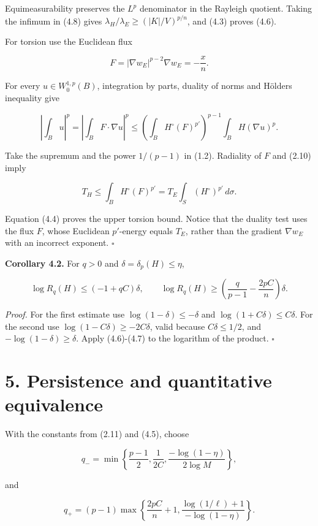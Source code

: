 \documentclass[11pt]{article}
\begin{document}
Equimeasurability preserves the \(L^p\) denominator in the Rayleigh
quotient. Taking the infimum in (4.8) gives
\(\lambda_H/\lambda_E\geq(|K|/V)^{p/n}\), and (4.3) proves (4.6).

For torsion use the Euclidean flux

\[
F=|\nabla w_E|^{p-2}\nabla w_E=-\frac xn.
\tag{4.10}
\]

For every \(u\in W^{1,p}_0(B)\), integration by parts, duality of norms
and Hölder\textquotesingle s inequality give

\[
\left|\int_Bu\right|^p
=\left|\int_BF\cdot\nabla u\right|^p
\leq\left(\int_BH^\circ(F)^{p'}\right)^{p-1}
\int_BH(\nabla u)^p.
\tag{4.11}
\]

Take the supremum and the power \(1/(p-1)\) in (1.2). Radiality of \(F\)
and (2.10) imply

\[
T_H\leq\int_BH^\circ(F)^{p'}
=T_E\int_S(H^\circ)^{p'}\,d\sigma.
\tag{4.12}
\]

Equation (4.4) proves the upper torsion bound. Notice that the duality
test uses the flux \(F\), whose Euclidean \(p'\)-energy equals \(T_E\),
rather than the gradient \(\nabla w_E\) with an incorrect exponent. \(\square\)

\textbf{Corollary 4.2.} For \(q>0\) and \(\delta=\delta_p(H)\leq\eta\),

\[
\log R_q(H)\leq(-1+qC)\delta,
\qquad
\log R_q(H)\geq
\left(\frac q{p-1}-\frac{2pC}{n}\right)\delta.
\tag{4.13}
\]

\emph{Proof.} For the first estimate use \(\log(1-\delta)\leq-\delta\)
and \(\log(1+C\delta)\leq C\delta\). For the second use
\(\log(1-C\delta)\geq-2C\delta\), valid because \(C\delta\leq1/2\), and
\(-\log(1-\delta)\geq\delta\). Apply (4.6)-(4.7) to the logarithm of the
product. \(\square\)

\section{5. Persistence and quantitative
equivalence}\label{persistence-and-quantitative-equivalence}

With the constants from (2.11) and (4.5), choose

\[
q_-=
\min\left\{\frac{p-1}{2},\frac1{2C},
\frac{-\log(1-\eta)}{2\log M}\right\},
\tag{5.1}
\]

and

\[
q_+=(p-1)\max\left\{\frac{2pC}{n}+1,
\frac{\log(1/\ell)+1}{-\log(1-\eta)}\right\}.
\tag{5.2}
\]
\end{document}
